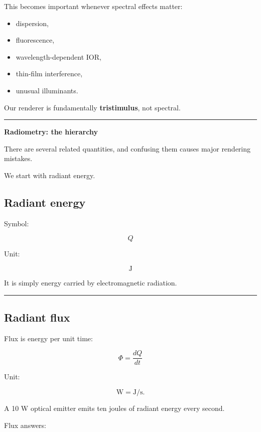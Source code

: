 This becomes important whenever spectral effects matter:

\begin{itemize}
\tightlist
\item
  dispersion,
\item
  fluorescence,
\item
  wavelength-dependent IOR,
\item
  thin-film interference,
\item
  unusual illuminants.
\end{itemize}

Our renderer is fundamentally \textbf{tristimulus}, not spectral.

\begin{center}\rule{0.5\linewidth}{0.5pt}\end{center}

\textbf{Radiometry: the hierarchy}

There are several related quantities, and confusing them causes major rendering mistakes.

We start with radiant energy.

\subsection{Radiant energy}\label{03-visual-computing-i-ch004-radiant-energy}

Symbol:

\[
Q
\]

Unit:

\[
\mathrm J
\]

It is simply energy carried by electromagnetic radiation.

\begin{center}\rule{0.5\linewidth}{0.5pt}\end{center}

\subsection{Radiant flux}\label{03-visual-computing-i-ch004-radiant-flux}

Flux is energy per unit time:

\[
\boxed{
\Phi=\frac{dQ}{dt}
}
\]

Unit:

\[
\mathrm W = \mathrm{J/s}.
\]

A 10 W optical emitter emits ten joules of radiant energy every second.

Flux answers:

